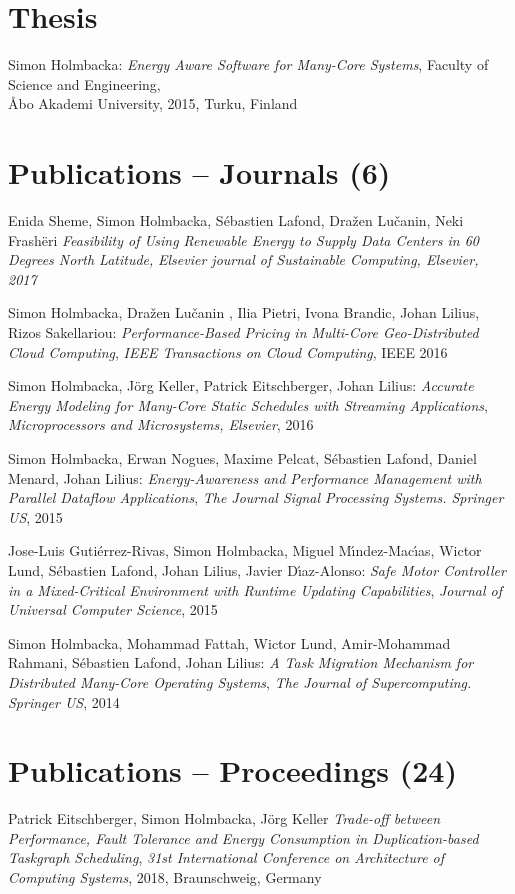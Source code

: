 \documentclass[margin,line]{resume}
\begin{document}
\begin{resume}
\section{\mysidestyle Thesis}    
Simon Holmbacka:
\textit{Energy Aware Software for Many-Core Systems},
Faculty of Science and Engineering,\\ \AA{}bo Akademi University, 2015, Turku, Finland

\section{\mysidestyle Publications -- Journals (6)}
Enida Sheme, Simon Holmbacka, S\'{e}bastien Lafond, Dra\v{z}en Lu\v{c}anin, Neki Frash\"{e}ri
\textit{Feasibility of Using Renewable Energy to Supply Data Centers in 60 Degrees North Latitude,}
\textsl{Elsevier journal of Sustainable Computing, Elsevier, 2017}

Simon Holmbacka, Dra\v{z}en Lu\v{c}anin , Ilia Pietri, Ivona Brandic, Johan Lilius, Rizos Sakellariou:
\textit{Performance-Based Pricing in Multi-Core Geo-Distributed Cloud Computing}, 
\textsl{IEEE Transactions on Cloud Computing}, IEEE 2016

Simon Holmbacka, J\"{o}rg Keller, Patrick Eitschberger, Johan Lilius:
\textit{Accurate Energy Modeling for Many-Core Static Schedules with Streaming Applications}, 
\textsl{Microprocessors and Microsystems, Elsevier}, 2016

Simon Holmbacka, Erwan Nogues, Maxime Pelcat, S\'{e}bastien Lafond, Daniel Menard, Johan Lilius:
\textit{Energy-Awareness and Performance Management with Parallel Dataflow Applications}, 
\textsl{The Journal Signal Processing Systems. Springer US}, 2015

Jose-Luis Guti\'{e}rrez-Rivas, Simon Holmbacka, Miguel M\'{\i}ndez-Mac\'{\i}as, Wictor Lund, S\'{e}bastien Lafond, Johan Lilius, Javier D\'{\i}az-Alonso:
\textit{Safe Motor Controller in a Mixed-Critical Environment with Runtime Updating Capabilities}, 
\textsl{Journal of Universal Computer Science}, 2015

Simon Holmbacka, Mohammad Fattah, Wictor Lund, Amir-Mohammad Rahmani, S\'{e}bastien Lafond, Johan Lilius:
\textit{A Task Migration Mechanism for Distributed Many-Core Operating Systems}, 
\textsl{The Journal of Supercomputing. Springer US}, 2014 


\section{\mysidestyle Publications -- Proceedings (24)}
Patrick Eitschberger, Simon Holmbacka, J\"{o}rg Keller
\textit{Trade-off between Performance, Fault Tolerance and Energy Consumption in Duplication-based Taskgraph Scheduling},
\textsl{31st International Conference on Architecture of Computing Systems}, 2018, Braunschweig, Germany


\end{resume}
\end{document}
